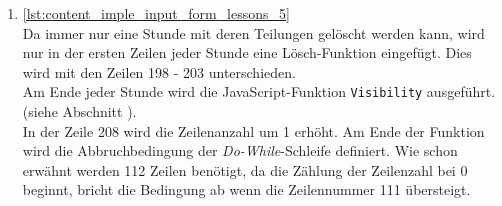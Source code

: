 \begin{enumerate}
	\item \autoref{lst:content_imple_input_form_lessons_5}\\
	Da immer nur eine Stunde mit deren Teilungen gelöscht werden kann, wird nur in der ersten Zeilen jeder Stunde eine Lösch-Funktion eingefügt. Dies wird mit den Zeilen 198 - 203 unterschieden.\\
	Am Ende jeder Stunde wird die JavaScript-Funktion \texttt{Visibility} ausgeführt. (siehe Abschnitt ).\\
	In der Zeile 208 wird die Zeilenanzahl um 1 erhöht. Am Ende der Funktion wird die Abbruchbedingung der \textit{Do-While}-Schleife definiert. Wie schon erwähnt werden 112 Zeilen benötigt, da die Zählung der Zeilenzahl bei 0 beginnt, bricht die Bedingung ab wenn die Zeilennummer 111 übersteigt.\\
	
	
	
\end{enumerate}

